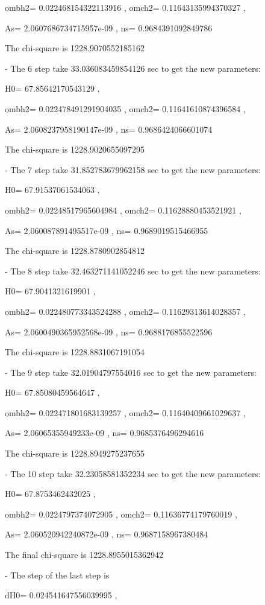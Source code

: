 \documentclass[showpacs, oneside, onecolumn, prl, amsmath, amssymb, nofootinbib, superscriptaddress, notitlepage]{revtex4-1}
\begin{document}
ombh2= 0.022468154322113916 , omch2= 0.11643135994370327 ,

As= 2.0607686734715957e-09 , ns= 0.9684391092849786

The chi-square is 1228.9070552185162


- The  6 step take  33.036083459854126 sec to get the new parameters:

H0= 67.85642170543129 ,

ombh2= 0.022478491291904035 , omch2= 0.11641610874396584 ,

As= 2.0608237958190147e-09 , ns= 0.9686424066601074

The chi-square is 1228.9020655097295


- The  7 step take  31.852783679962158 sec to get the new parameters:

H0= 67.91537061534063 ,

ombh2= 0.02248517965604984 , omch2= 0.11628880453521921 ,

As= 2.060087891495517e-09 , ns= 0.9689019515466955

The chi-square is 1228.8780902854812


- The  8 step take  32.463271141052246 sec to get the new parameters:

H0= 67.9041321619901 ,

ombh2= 0.022480773343524288 , omch2= 0.11629313614028357 ,

As= 2.0600490365952568e-09 , ns= 0.9688176855522596

The chi-square is 1228.8831067191054


- The  9 step take  32.01904797554016 sec to get the new parameters:

H0= 67.85080459564647 ,

ombh2= 0.022471801683139257 , omch2= 0.11640409661029637 ,

As= 2.06065355949233e-09 , ns= 0.9685376496294616

The chi-square is 1228.8949275237655


- The  10 step take  32.23058581352234 sec to get the new parameters:

H0= 67.8753462432025 ,

ombh2= 0.0224797374072905 , omch2= 0.11636774179760019 ,

As= 2.060520942240872e-09 , ns= 0.9687158967380484

The final chi-square is 1228.8955015362942


- The step of the last step is 

dH0= 0.024541647556039995 ,
\end{document}
